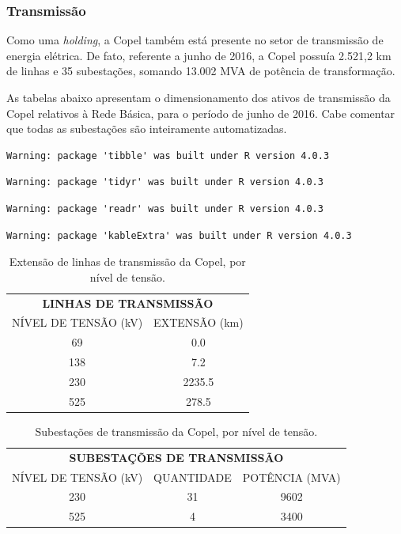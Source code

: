 \documentclass[grad,numbers]{coppe}
\begin{document}
  \hypertarget{transmissuxe3o}{%
  \subsubsection{Transmissão}\label{transmissuxe3o}}

  Como uma \emph{holding}, a Copel também está presente no setor de transmissão de energia elétrica. De fato, referente a junho de 2016, a Copel possuía 2.521,2 km de linhas e 35 subestações, somando 13.002 MVA de potência de transformação.

  As tabelas abaixo apresentam o dimensionamento dos ativos de transmissão da Copel relativos à Rede Básica, para o período de junho de 2016. Cabe comentar que todas as subestações são inteiramente automatizadas.
\begin{verbatim}
Warning: package 'tibble' was built under R version 4.0.3
\end{verbatim}
\begin{verbatim}
Warning: package 'tidyr' was built under R version 4.0.3
\end{verbatim}
\begin{verbatim}
Warning: package 'readr' was built under R version 4.0.3
\end{verbatim}
\begin{verbatim}
Warning: package 'kableExtra' was built under R version 4.0.3
\end{verbatim}
  \begin{table}[H]

  \caption{\label{tab:unnamed-chunk-3}Extensão de linhas de transmissão da Copel, por nível de tensão.}
  \centering
  \begin{tabular}[t]{cc}
  \toprule
  \multicolumn{2}{c}{\textbf{LINHAS DE TRANSMISSÃO}} \\
  \cmidrule(l{3pt}r{3pt}){1-2}
  NÍVEL DE TENSÃO (kV) & EXTENSÃO (km)\\
  \midrule
  69 & 0.0\\
  138 & 7.2\\
  230 & 2235.5\\
  525 & 278.5\\
  \bottomrule
  \end{tabular}
  \end{table}
  \begin{table}[H]

  \caption{\label{tab:unnamed-chunk-4}Subestações de transmissão da Copel, por nível de tensão.}
  \centering
  \begin{tabular}[t]{ccc}
  \toprule
  \multicolumn{3}{c}{\textbf{SUBESTAÇÕES DE TRANSMISSÃO}} \\
  \cmidrule(l{3pt}r{3pt}){1-3}
  NÍVEL DE TENSÃO (kV) & QUANTIDADE & POTÊNCIA (MVA)\\
  \midrule
  230 & 31 & 9602\\
  525 & 4 & 3400\\
  \bottomrule
  \end{tabular}
  \end{table}
  \(\,\)
\end{document}
